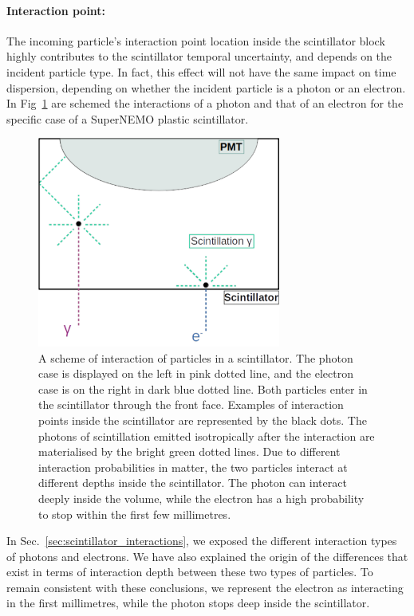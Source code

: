 \paragraph{Interaction point:}
The incoming particle's interaction point location inside the scintillator block highly contributes to the scintillator temporal uncertainty, and depends on the incident particle type.
In fact, this effect will not have the same impact on time dispersion, depending on whether the incident particle is a photon or an electron.
In Fig~\ref{fig:photon_scintilator} are schemed the interactions of a photon and that of an electron for the specific case of a SuperNEMO plastic scintillator.
\begin{figure}[h]
  \centering
  \includegraphics[width=8cm]{commissioning/fig_commissioning/Co_multi_reflection.pdf}
  \caption{A scheme of interaction of particles in a scintillator.
    The photon case is displayed on the left in pink dotted line, and the electron case is on the right in dark blue dotted line.
    Both particles enter in the scintillator through the front face.
    Examples of interaction points inside the scintillator are represented by the black dots.
    The photons of scintillation emitted isotropically after the interaction are materialised by the bright green dotted lines.
    Due to different interaction probabilities in matter, the two particles interact at different depths inside the scintillator.
    The photon can interact deeply inside the volume, while the electron has a high probability to stop within the first few millimetres.
    \label{fig:photon_scintilator}}
\end{figure}
In Sec.~\ref{sec:scintillator_interactions}, we exposed the different interaction types of photons and electrons.
We have also explained the origin of the differences that exist in terms of interaction depth between these two types of particles.
To remain consistent with these conclusions, we represent the electron as interacting in the first millimetres, while the photon stops deep inside the scintillator.
